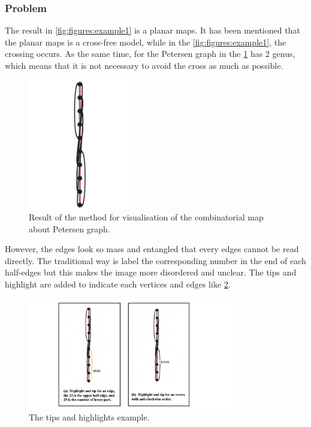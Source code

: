   \subsubsection{Problem}
  The result in \cref{fig:figures:example1} is a planar maps. It has been mentioned that the planar maps is a cross-free model, while in the \cref{fig:figures:example1}, the crossing occurs. As the same time, for the Petersen graph in the \cref{fig:figures:pertersengraph1} has 2 genus, which means that it is not necessary to avoid the cross as much as possible. 

  \begin{figure}[htb]
    \centering
    \includegraphics[width=0.4\textwidth]{../../image/pertersengraph1.png}
    \caption{Result of the method for visualisation of the combinatorial map about Petersen graph.}
    \label{fig:figures:pertersengraph1}
  \end{figure}

  However, the edges look so mass and entangled that every edges cannot be read directly. The traditional way is label the corresponding number in the end of each half-edges but this makes the image more disordered and unclear. The tips and highlight are added to indicate each vertices and edges like \cref{fig:figures:highlight}.

  \begin{figure}[htb]
    \centering
    \includegraphics[width=0.8\textwidth]{../../image/highlight.png}
    \caption{The tips and highlights example.}
    \label{fig:figures:highlight}
  \end{figure}


